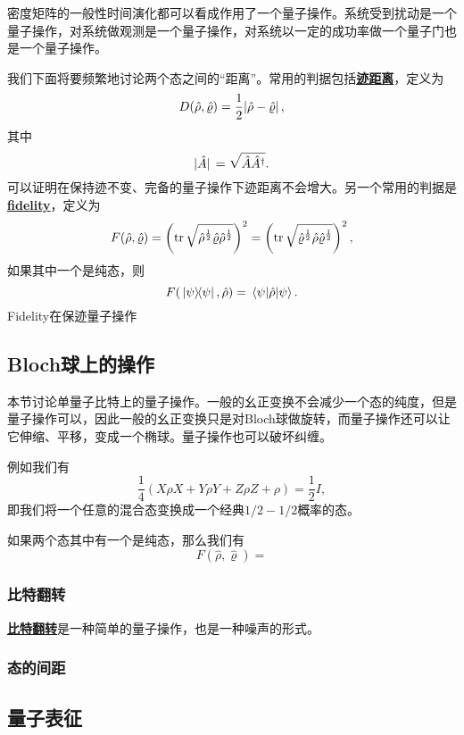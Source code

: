 \documentclass[hyperref, UTF8, a4paper]{ctexart}
\newcommand*{\concept}[1]{\underline{\textbf{#1}}}
\begin{document}
密度矩阵的一般性时间演化都可以看成作用了一个量子操作。系统受到扰动是一个量子操作，对系统做观测是一个量子操作，对系统以一定的成功率做一个量子门也是一个量子操作。

我们下面将要频繁地讨论两个态之间的“距离”。常用的判据包括\concept{迹距离}，定义为
\[
    D(\hat{\rho}, \hat{\varrho}) = \frac{1}{2} \abs*{\hat{\rho} - \hat{\varrho}},
\]
其中
\[
    \abs*{\hat{A}} = \sqrt{\hat{A} \hat{A}^\dagger}.
\]
可以证明在保持迹不变、完备的量子操作下迹距离不会增大。另一个常用的判据是\concept{fidelity}，定义为
\[
    F(\hat{\rho}, \hat{\varrho}) = \left( \trace \sqrt{\hat{\rho}^{\frac{1}{2}} \hat{\varrho} \hat{\rho}^{\frac{1}{2}}} \right)^2 = \left( \trace \sqrt{\hat{\varrho}^{\frac{1}{2}} \hat{\rho} \hat{\varrho}^{\frac{1}{2}}} \right)^2,
\]
如果其中一个是纯态，则
\[
    F(\dyad*{\psi}, \hat{\rho}) = \mel{\psi}{\hat{\rho}}{\psi}.
\]
Fidelity在保迹量子操作

\subsection{Bloch球上的操作}

本节讨论单量子比特上的量子操作。一般的幺正变换不会减少一个态的纯度，但是量子操作可以，因此一般的幺正变换只是对Bloch球做旋转，而量子操作还可以让它伸缩、平移，变成一个椭球。量子操作也可以破坏纠缠。

例如我们有
\begin{equation}
    \frac{1}{4} (X \rho X + Y \rho Y + Z \rho Z + \rho) = \frac{1}{2} I,
\end{equation}
即我们将一个任意的混合态变换成一个经典$1/2-1/2$概率的态。

如果两个态其中有一个是纯态，那么我们有
\begin{equation}
    F(\hat{\rho}, \hat{\varrho}) = 
\end{equation}

\subsubsection{比特翻转}

\concept{比特翻转}是一种简单的量子操作，也是一种噪声的形式。

\subsubsection{态的间距}



\subsection{量子表征}
\end{document}
